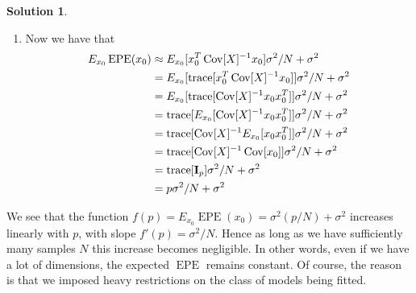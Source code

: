 \documentclass[]{book}
\theoremstyle{definition}
\newtheorem*{soln}{Solution}
\newcommand{\XX}{\mathbf{X}} \newcommand{\YY}{\mathbf{Y}}
\DeclareMathOperator*{\EPE}{EPE} \DeclareMathOperator*{\Var}{Var}
\DeclareMathOperator*{\Bias}{Bias} \DeclareMathOperator*{\tr}{trace}
\begin{document}
\begin{enumerate}
\begin{soln}
{\begin{enumerate}
\begin{equation}
\begin{split}
						      &= x_0^T\beta + \sum_{i-1}^N\Exp[\ell_i(x_0)]\Exp[\varepsilon_i] \\
						      &= x_0^T\beta,
					      \end{split}
				      \end{equation}
				      since $\varepsilon_i$ is independent of $x_0$ and $\XX$.
				      Hence, $\Bias(\hat y_0)=\left(\Exp[\hat
						      y_0]-x_0^T\beta\right)=0$. Last, we want to calculate the
				      variance of our prediction $\Var[\hat y_0]$. We have
				      \begin{equation}
					      \begin{split}
						      \Var[\hat y_0] &= \Var[x_0^T\hat\beta] \\
						      &= x_0^T\Cov[\hat\beta]x_0 \\
						      &= x_0^T(\XX^T\XX)^{-1}\sigma^2x_0,
					      \end{split}
				      \end{equation}
				      where the last line comes from~\cref{eq:cov}.
				\item Now we have that
				      \begin{equation}
					      \begin{split}
						      E_{x_0}\EPE(x_0) &\approx E_{x_0}[x_0^T \Cov[X]^{-1}x_0]\sigma^2/N + \sigma^2 \\
						      &= E_{x_0}[\tr[x_0^T \Cov[X]^{-1}x_0]]\sigma^2/N + \sigma^2 \\
						      &= E_{x_0}[\tr[\Cov[X]^{-1}x_0x_0^T]]\sigma^2/N + \sigma^2 \\
						      &= \tr[E_{x_0}[\Cov[X]^{-1}x_0x_0^T]]\sigma^2/N + \sigma^2 \\
						      &= \tr[\Cov[X]^{-1}E_{x_0}[x_0x_0^T]]\sigma^2/N + \sigma^2 \\
						      &= \tr[\Cov[X]^{-1}\Cov[x_0]]\sigma^2/N + \sigma^2 \\
						      &= \tr[\mathbf{I}_p]\sigma^2/N + \sigma^2 \\
						      &= p\sigma^2/N + \sigma^2
					      \end{split}
				      \end{equation}
			\end{enumerate}
		} We see that the function
		$f(p)=E_{x_0}\EPE(x_0)=\sigma^2(p/N)+\sigma^2$ increases linearly with
		$p$, with slope $f'(p)=\sigma^2/N$. Hence as long as we have
		sufficiently many samples $N$ this increase becomes negligible. In other
		words, even if we have a lot of dimensions, the expected $\EPE$ remains
		constant. Of course, the reason is that we imposed heavy restrictions on
		the class of models being fitted.
	\end{soln}


\end{enumerate}
\end{document}
